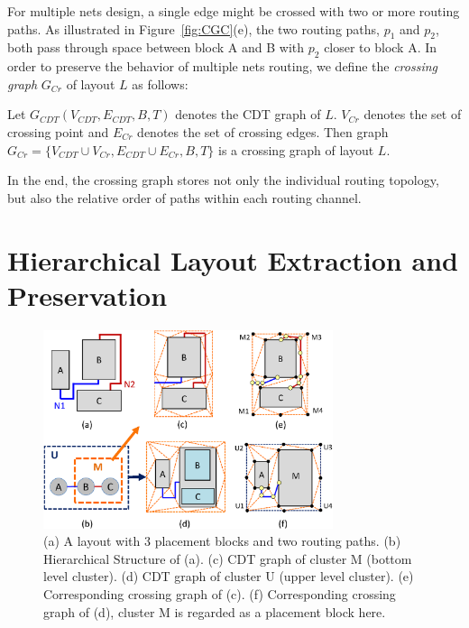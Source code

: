     For multiple nets design, a single edge might be crossed with two or more routing paths. As illustrated in Figure~\ref{fig:CGC}(e), the two routing paths, $p_1$ and $p_2$, both pass through space between block A and B with $p_2$ closer to block A. In order to preserve the behavior of multiple nets routing, we define the {\it crossing graph} $G_{Cr}$ of layout $L$ as follows:
    \vspace{0.2cm}
    \begin{defi}\label{defi:CrossGraph}
      Let $G_{CDT}(V_{CDT},E_{CDT},B,T)$ denotes the CDT graph of $L$. $V_{Cr}$ denotes the set of crossing point and $E_{Cr}$ denotes the set of crossing edges. Then graph $G_{Cr} = \{V_{CDT} \cup V_{Cr},E_{CDT} \cup E_{Cr},B,T\}$ is a crossing graph of layout $L$. 
    \end{defi}
    \vspace{0.2cm}
    In the end, the crossing graph stores not only the individual routing topology, but also the relative order of paths within each routing channel.


  \section{Hierarchical Layout Extraction and Preservation}\label{sec:HLE}

    \begin{figure}[t]
      \begin{center}
      \includegraphics[width=8.5cm]{Fig/HIER.eps}
      \caption{
         (a) A layout with 3 placement blocks and two routing paths. 
         (b) Hierarchical Structure of (a).
         (c) CDT graph of cluster M (bottom level cluster).
         (d) CDT graph of cluster U (upper level cluster).
         (e) Corresponding crossing graph of (c).
         (f) Corresponding crossing graph of (d), cluster M is regarded as a placement block here.
        }
      \label{fig:HIER}
      \end{center}
    \end{figure}

